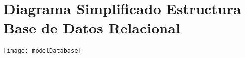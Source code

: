 \chapter{Diagrama Simplificado Estructura Base de Datos Relacional}

\begin{minipage}{1.0\textwidth}
	\centering
	\texttt{[image: modelDatabase]}
\end{minipage}
